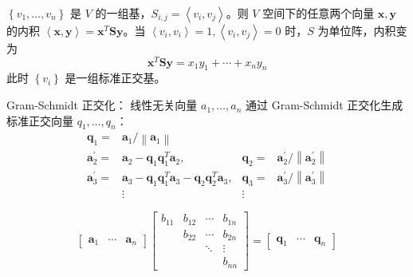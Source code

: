 \begin{remark}
    $\left\{v_1, \dots, v_n\right\}$ 是 $V$ 的一组基，$S_{i, j} = \left\langle v_{i}, v_{j}\right\rangle$。则 $V$ 空间下的任意两个向量 $\boldsymbol{x}, \boldsymbol{y}$ 的内积 $\left\langle\boldsymbol{x}, \boldsymbol{y}\right\rangle=\boldsymbol{x}^T\boldsymbol{S}\boldsymbol{y}$。当 $\left\langle v_{i}, v_{i}\right\rangle = 1, \left\langle v_{i}, v_{j}\right\rangle = 0$ 时，$S$ 为单位阵，内积变为 \[\boldsymbol{x}^T\boldsymbol{S}\boldsymbol{y} = x_1y_1 + \cdots + x_ny_n\]
    此时 $\left\{v_i\right\}$ 是一组标准正交基。
\end{remark}

\begin{remark}
    Gram-Schmidt 正交化：
    线性无关向量 $a_1, \dots, a_n$ 通过 Gram-Schmidt 正交化生成标准正交向量 $q_1, \dots, q_n$：
    \begin{align*}
        \boldsymbol{q}_{1}= & \boldsymbol{a}_{1} /\left\|\boldsymbol{a}_{1}\right\| & & \\
        \boldsymbol{a}_{2}^{\prime}= &\boldsymbol{a}_{2}-\boldsymbol{q}_{1} \boldsymbol{q}_{1}^{T} \boldsymbol{a}_{2}, & \boldsymbol{q}_{2}=&\boldsymbol{a}_{2}^{\prime} /\left\|\boldsymbol{a}_{2}^{\prime}\right\| \\
        \boldsymbol{a}_{3}^{\prime}= & \boldsymbol{a}_{3}-\boldsymbol{q}_{1} \boldsymbol{q}_{1}^{T} \boldsymbol{a}_{3}-\boldsymbol{q}_{2} \boldsymbol{q}_{2}^{T} \boldsymbol{a}_{3}, & \boldsymbol{q}_{3}=&\boldsymbol{a}_{3}^{\prime} /\left\|\boldsymbol{a}_{3}^{\prime}\right\| \\
        & \vdots & \vdots &
    \end{align*}

    \[\begin{bmatrix}
        \boldsymbol{a}_{1} & \cdots & \boldsymbol{a}_{n}
    \end{bmatrix}\begin{bmatrix}
        b_{11} & b_{12} & \cdots & b_{1 n} \\
        & b_{22} & \cdots & b_{2 n} \\
        & & \ddots & \vdots \\
        & & & b_{n n}
    \end{bmatrix}=\begin{bmatrix}
        \boldsymbol{q}_{1} & \cdots & \boldsymbol{q}_{n}
    \end{bmatrix}\]


\end{remark}
